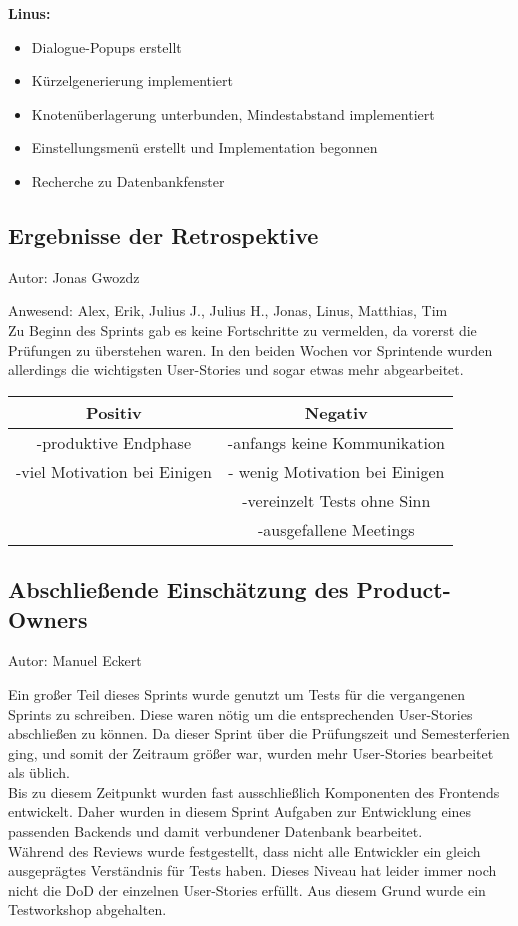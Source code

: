 \textbf{Linus:}
\begin{itemize}
\item Dialogue-Popups erstellt
\item Kürzelgenerierung implementiert
\item Knotenüberlagerung unterbunden, Mindestabstand implementiert
\item Einstellungsmenü erstellt und Implementation begonnen
\item Recherche zu Datenbankfenster
\end{itemize}

\subsection{Ergebnisse der Retrospektive}
{\small Autor: Jonas Gwozdz}

Anwesend: Alex, Erik, Julius J., Julius H., Jonas, Linus, Matthias, Tim\\

Zu Beginn des Sprints gab es keine Fortschritte zu vermelden, da vorerst die Prüfungen zu überstehen waren. In den beiden Wochen vor Sprintende wurden allerdings die wichtigsten User-Stories und sogar etwas mehr abgearbeitet.\\

\begin{center}
\begin{tabular}{ |c|c| }
\hline
 Positiv & Negativ \\
\hline 
 -produktive Endphase & -anfangs keine Kommunikation \\
 -viel Motivation bei Einigen & - wenig Motivation bei Einigen\\
 & -vereinzelt Tests ohne Sinn\\
 & -ausgefallene Meetings\\
\hline     
\end{tabular}
\end{center}
 

\subsection{Abschließende Einschätzung des Product-Owners}
{\small Autor: Manuel Eckert}

Ein großer Teil dieses Sprints wurde genutzt um Tests für die vergangenen Sprints zu schreiben. Diese waren nötig um die entsprechenden User-Stories abschließen zu können. Da dieser Sprint über die Prüfungszeit und Semesterferien ging, und somit der Zeitraum größer war, wurden mehr  User-Stories bearbeitet als üblich. \\
Bis zu diesem Zeitpunkt wurden fast ausschließlich Komponenten des Frontends entwickelt. Daher wurden in diesem Sprint Aufgaben zur Entwicklung eines passenden Backends und damit verbundener Datenbank bearbeitet. \\
Während des Reviews wurde festgestellt, dass nicht alle Entwickler ein gleich ausgeprägtes Verständnis für Tests haben. Dieses Niveau hat leider immer noch nicht die DoD der einzelnen User-Stories erfüllt. Aus diesem Grund wurde ein Testworkshop abgehalten.

